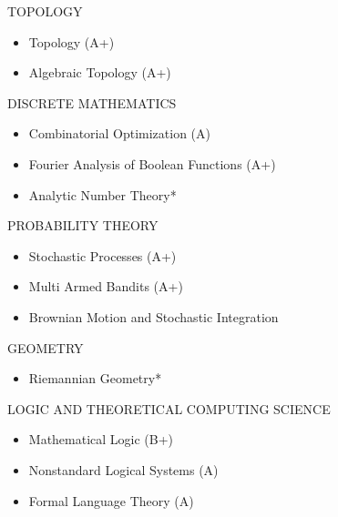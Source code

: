 \documentclass{friggeri-cv} %
\begin{document}
\begin{entrylist}
\entries
{TOPOLOGY}
{
\begin{itemize}
    \setlength\itemsep{-1em}
    \item Topology (A+)\\
    \item Algebraic Topology (A+)
\end{itemize}
}

\entries
{DISCRETE MATHEMATICS}
{
\begin{itemize}
    \setlength\itemsep{-1em}
    \item Combinatorial Optimization (A)\\
    \item Fourier Analysis of Boolean Functions (A+)\\
    \item Analytic Number Theory*
\end{itemize}
}


\end{entrylist}


\begin{entrylist}

\entries
{PROBABILITY THEORY}
{
\begin{itemize}
    \setlength\itemsep{-1em}
    \item Stochastic Processes (A+)\\
    \item Multi Armed Bandits (A+)\\
    \item Brownian Motion and Stochastic Integration
\end{itemize}
}


\entries
{GEOMETRY}
{
\begin{itemize}
    \setlength\itemsep{-1em}
    \item Riemannian Geometry*
\end{itemize}
}


\entries
{LOGIC AND THEORETICAL COMPUTING SCIENCE}
{
\begin{itemize}
    \setlength\itemsep{-1em}
    \item Mathematical Logic (B+)\\
    \item Nonstandard Logical Systems (A)\\
    \item Formal Language Theory (A)
\end{itemize}
}


\end{entrylist}
\end{document}
